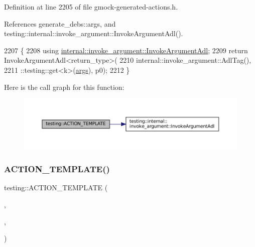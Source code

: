 Definition at line 2205 of file gmock-\/generated-\/actions.\+h.



References generate\+\_\+debs\+::args, and testing\+::internal\+::invoke\+\_\+argument\+::\+Invoke\+Argument\+Adl().


\begin{DoxyCode}
2207                                         \{
2208   \textcolor{keyword}{using} \hyperlink{namespacetesting_1_1internal_1_1invoke__argument_abd36164191a3e386c50243074854b272}{internal::invoke\_argument::InvokeArgumentAdl};
2209   \textcolor{keywordflow}{return} InvokeArgumentAdl<return\_type>(
2210       internal::invoke\_argument::AdlTag(),
2211       ::testing::get<k>(\hyperlink{namespacegenerate__debs_a75f9143e38df82d83b2e8a6f99cae02c}{args}), p0);
2212 \}
\end{DoxyCode}
Here is the call graph for this function\+:
\nopagebreak
\begin{figure}[H]
\begin{center}
\leavevmode
\includegraphics[width=350pt]{namespacetesting_afaa0d88f5442f9aee5d6147377d3e50c_cgraph}
\end{center}
\end{figure}
\mbox{\label{namespacetesting_a39bf6c49dc1323cc9539a12249e60aba}} 
\subsubsection{\texorpdfstring{A\+C\+T\+I\+O\+N\+\_\+\+T\+E\+M\+P\+L\+A\+T\+E()}{ACTION\_TEMPLATE()}\hspace{0.1cm}{\footnotesize\ttfamily [9/28]}}
{\footnotesize\ttfamily testing\+::\+A\+C\+T\+I\+O\+N\+\_\+\+T\+E\+M\+P\+L\+A\+TE (\begin{DoxyParamCaption}\item[{Invoke\+Argument}]{,  }\item[{H\+A\+S\+\_\+1\+\_\+\+T\+E\+M\+P\+L\+A\+T\+E\+\_\+\+P\+A\+R\+A\+MS(int, k)}]{,  }\item[{A\+N\+D\+\_\+2\+\_\+\+V\+A\+L\+U\+E\+\_\+\+P\+A\+R\+A\+MS(p0, p1)}]{ }\end{DoxyParamCaption})}



